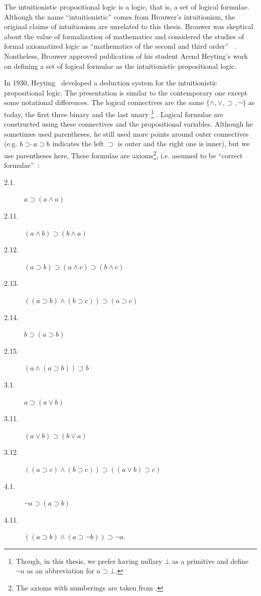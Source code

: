 The intuitionistic propositional logic is a logic, that is, a set of
logical formulae.
Although the name ``intuitionistic'' comes from Brouwer's
intuitionism,
the original claims of intuitionism are unrelated to this thesis.
Brouwer was skeptical about the value of formalization of
mathematics and considered the studies of formal axiomatized logic as
``mathematics of the second and third order''%
~\citep[p.~10]{stigt1998}.
Nontheless, Brouwer approved publication of his student Arend Heyting's
work on defining a set of logical formulae as the intuitionistic
propositional logic.

In 1930, Heyting~\cite{heyting1930} developed a deduction
system for the
intuitionistic propositional logic.  The presentation is similar to
the contemporary one except some notational differences.  The
logical connectives are the same $\{\wedge,\vee,\supset,\neg\}$ as today, the
first three binary and the last unary%
\footnote{Though, in this thesis, we prefer having nullary $\bot$ as a
primitive and define $\neg a$ as an abbreviation for $a\supset\bot$.}%
.  Logical formulae are constructed
using these connectives and the propositional variables.
Although he sometimes used parentheses, he still used more points
around outer connectives (e.g. $b\supset \kern -3pt\cdot \kern 2pt  a
\supset b$ indicates the left $\supset$ is outer and the right one is
inner), but we use parentheses here.
These formulae are axioms\footnote{The axioms with numberings are taken
from \citet{heyting1930}.}, i.e. assumed to be
``correct formulae''~\cite{heyting1930}:
\begin{description}
 \item[2.1.] $a\supset (a\land a)$
 \item[2.11.] $(a\land b)\supset (b\land a)$
 \item[2.12.] $(a\supset b)\supset (a\land c)\supset (b\land c)$
 \item[2.13.] $((a\supset b)\land (b\supset c))\supset (a\supset c)$
 \item[2.14.] $b\supset (a\supset b)$
 \item[2.15.] $(a\land (a\supset b))\supset b$
 \item[3.1.] $a\supset (a\lor b)$
 \item[3.11.] $(a\lor b)\supset (b\lor a)$
 \item[3.12.] $((a\supset c)\land(b\supset c))\supset ((a\lor b)\supset
      c)$
 \item[4.1.] $\neg a\supset (a\supset b)$
 \item[4.11.] $((a\supset b)\land (a\supset \neg b)) \supset \neg a$\enspace.
\end{description}

